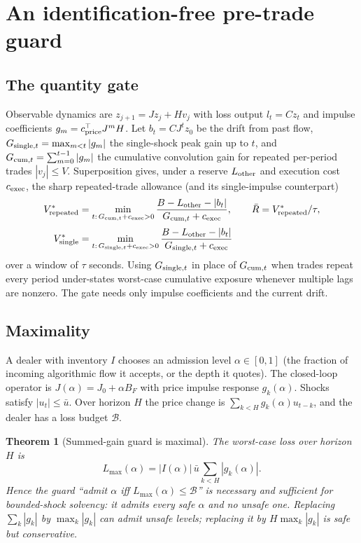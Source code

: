 \documentclass[12pt]{article}
\newtheorem{theorem}{Theorem}[section]
\theoremstyle{definition}
\theoremstyle{remark}
\begin{document}
\section{An identification-free pre-trade guard}\label{sec:guard}

\subsection{The quantity gate}
Observable dynamics are $z_{j+1}=Jz_j+Hv_j$ with loss output $l_t=Cz_t$ and impulse coefficients $g_m=c^\top_{\rm price}J^mH$. Let $b_t=CJ^tz_0$ be the drift from past flow, $G_{{\rm single},t}=\max_{m<t}|g_m|$ the single-shock peak gain up to $t$, and $G_{{\rm cum},t}=\sum_{m=0}^{t-1}|g_m|$ the cumulative convolution gain for repeated per-period trades $|v_j|\le V$. Superposition gives, under a reserve $L_{\rm other}$ and execution cost $c_{\rm exec}$, the sharp repeated-trade allowance (and its single-impulse counterpart)
\begin{equation}\label{eq:gate}
\begin{aligned}
V^*_{\rm repeated} &= \min_{t:\,G_{{\rm cum},t}+c_{\rm exec}>0}\frac{B-L_{\rm other}-|b_t|}{G_{{\rm cum},t}+c_{\rm exec}}, \qquad\bar R=V^*_{\rm repeated}/\tau, \\[2pt]
V^*_{\rm single} &= \min_{t:\,G_{{\rm single},t}+c_{\rm exec}>0}\frac{B-L_{\rm other}-|b_t|}{G_{{\rm single},t}+c_{\rm exec}}
\end{aligned}
\end{equation}
over a window of $\tau$ seconds. Using $G_{{\rm single},t}$ in place of $G_{{\rm cum},t}$ when trades repeat every period under-states worst-case cumulative exposure whenever multiple lags are nonzero. The gate needs only impulse coefficients and the current drift.

\subsection{Maximality}
A dealer with inventory $I$ chooses an admission level $\alpha\in[0,1]$ (the fraction of incoming algorithmic flow it accepts, or the depth it quotes). The closed-loop operator is $J(\alpha)=J_0+\alpha B_F$ with price impulse response $g_k(\alpha)$. Shocks satisfy $|u_t|\le\bar u$. Over horizon $H$ the price change is $\sum_{k<H}g_k(\alpha)u_{t-k}$, and the dealer has a loss budget $\mathcal B$.

\begin{theorem}[Summed-gain guard is maximal]\label{thm:guard}
The worst-case loss over horizon $H$ is
\[
L_{\max}(\alpha)=|I(\alpha)|\,\bar u\sum_{k<H}|g_k(\alpha)|.
\]
Hence the guard ``admit $\alpha$ iff $L_{\max}(\alpha)\le\mathcal B$'' is necessary and sufficient for bounded-shock solvency: it admits every safe $\alpha$ and no unsafe one. Replacing $\sum_k|g_k|$ by $\max_k|g_k|$ can admit unsafe levels; replacing it by $H\max_k|g_k|$ is safe but conservative.
\end{theorem}
\end{document}
